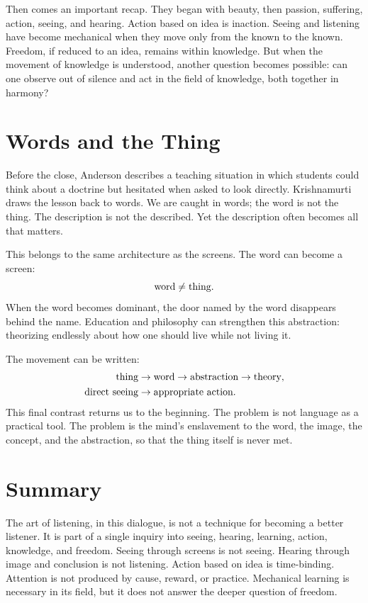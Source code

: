 Then comes an important recap. They began with beauty, then passion, suffering, action, seeing, and hearing. Action based on idea is inaction. Seeing and listening have become mechanical when they move only from the known to the known. Freedom, if reduced to an idea, remains within knowledge. But when the movement of knowledge is understood, another question becomes possible: can one observe out of silence and act in the field of knowledge, both together in harmony?

\section{Words and the Thing}

Before the close, Anderson describes a teaching situation in which students could think about a doctrine but hesitated when asked to look directly. Krishnamurti draws the lesson back to words. We are caught in words; the word is not the thing. The description is not the described. Yet the description often becomes all that matters.

This belongs to the same architecture as the screens. The word can become a screen:
\begin{equation}
\hbox{word} \neq \hbox{thing}.
\end{equation}
When the word becomes dominant, the door named by the word disappears behind the name. Education and philosophy can strengthen this abstraction: theorizing endlessly about how one should live while not living it.

The movement can be written:
\begin{align}
\hbox{thing}
&\to
\hbox{word}
\to
\hbox{abstraction}
\to
\hbox{theory},\\
\hbox{direct seeing}
&\to
\hbox{appropriate action}.
\end{align}
This final contrast returns us to the beginning. The problem is not language as a practical tool. The problem is the mind's enslavement to the word, the image, the concept, and the abstraction, so that the thing itself is never met.

\section{Summary}

The art of listening, in this dialogue, is not a technique for becoming a better listener. It is part of a single inquiry into seeing, hearing, learning, action, knowledge, and freedom. Seeing through screens is not seeing. Hearing through image and conclusion is not listening. Action based on idea is time-binding. Attention is not produced by cause, reward, or practice. Mechanical learning is necessary in its field, but it does not answer the deeper question of freedom.

